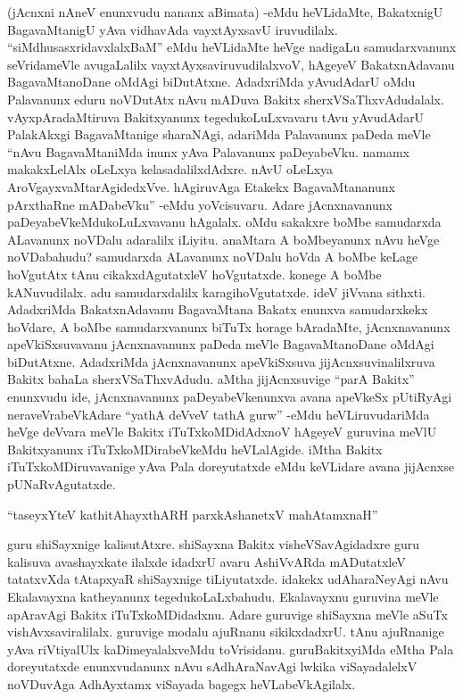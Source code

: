 (jAcnxni nAneV enunxvudu nananx aBimata) -eMdu heVLidaMte, BakatxnigU BagavaMtanigU yAva vidhavAda vayxtAyxsavU iruvudilalx. ``siMdhusasxridavxlalxBaM'' eMdu heVLidaMte heVge nadigaLu samudarxvanunx seVridameVle avugaLalilx vayxtAyxsaviruvudilalxvoV, hAgeyeV BakatxnAdavanu BagavaMtanoDane oMdAgi biDutAtxne. AdadxriMda yAvudAdarU oMdu Palavanunx eduru noVDutAtx nAvu mADuva Bakitx sherxVSaThxvAdudalalx. vAyxpAradaMtiruva Bakitxyanunx tegedukoLuLxvavaru tAvu yAvudAdarU PalakAkxgi BagavaMtanige sharaNAgi, adariMda Palavanunx paDeda meVle ``nAvu BagavaMtaniMda inunx yAva Palavanunx paDeyabeVku. namamx makakxLelAlx oLeLxya kelasadalilxdAdxre. nAvU oLeLxya AroVgayxvaMtarAgidedxVve. hAgiruvAga Etakekx BagavaMtananunx pArxthaRne mADabeVku'' -eMdu yoVcisuvaru. Adare jAcnxnavanunx paDeyabeVkeMdukoLuLxvavanu hAgalalx. oMdu sakakxre boMbe samudarxda ALavanunx noVDalu adaralilx iLiyitu. anaMtara A boMbeyanunx nAvu heVge noVDabahudu? samudarxda ALavanunx noVDalu hoVda A boMbe keLage hoVgutAtx tAnu cikakxdAgutatxleV hoVgutatxde. konege A boMbe kANuvudilalx. adu samudarxdalilx karagihoVgutatxde. ideV jiVvana sithxti. AdadxriMda BakatxnAdavanu BagavaMtana Bakatx enunxva samudarxkekx hoVdare, A boMbe samudarxvanunx biTuTx horage bAradaMte, jAcnxnavanunx apeVkiSxsuvavanu jAcnxnavanunx paDeda meVle BagavaMtanoDane oMdAgi biDutAtxne. AdadxriMda jAcnxnavanunx apeVkiSxsuva jijAcnxsuvinalilxruva Bakitx bahaLa sherxVSaThxvAdudu. aMtha jijAcnxsuvige ``parA Bakitx'' enunxvudu ide, jAcnxnavanunx paDeyabeVkenunxva avana apeVkeSx pUtiRyAgi neraveVrabeVkAdare ``yathA deVveV tathA gurw'' -eMdu heVLiruvudariMda heVge deVvara meVle Bakitx iTuTxkoMDidAdxnoV hAgeyeV guruvina meVlU Bakitxyanunx iTuTxkoMDirabeVkeMdu heVLalAgide. iMtha Bakitx iTuTxkoMDiruvavanige yAva Pala doreyutatxde eMdu keVLidare avana jijAcnxse pUNaRvAgutatxde.

\begin{shloka}
``taseyxYteV kathitAhayxthARH parxkAshanetxV mahAtamxnaH''
\end{shloka}

guru shiSayxnige kalisutAtxre. shiSayxna Bakitx visheVSavAgidadxre guru kalisuva avashayxkate ilalxde idadxrU avaru AshiVvARda mADutatxleV tatatxvXda tAtapxyaR shiSayxnige tiLiyutatxde. idakekx udAharaNeyAgi nAvu Ekalavayxna katheyanunx tegedukoLaLxbahudu. Ekalavayxnu guruvina meVle apAravAgi Bakitx iTuTxkoMDidadxnu. Adare guruvige shiSayxna meVle aSuTx vishAvxsaviralilalx. guruvige modalu ajuRnanu sikikxdadxrU. tAnu ajuRnanige yAva riVtiyalUlx kaDimeyalalxveMdu toVrisidanu. guruBakitxyiMda eMtha Pala doreyutatxde enunxvudanunx nAvu sAdhAraNavAgi lwkika viSayadalelxV noVDuvAga AdhAyxtamx viSayada bagegx heVLabeVkAgilalx.


